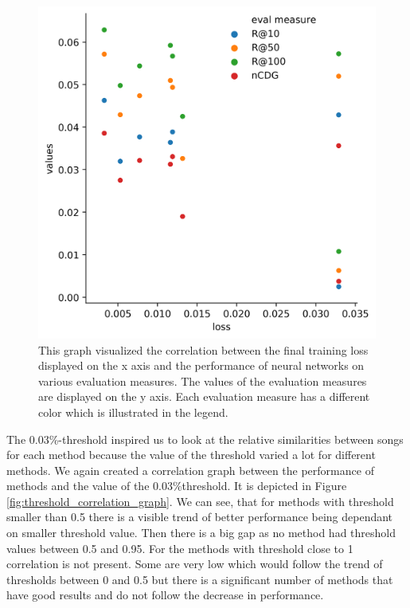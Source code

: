 \begin{figure}[h]
    \centering
	\includegraphics[width=1\linewidth]{./img/nn_training_performance_correlation.png}
	\caption[Training loss and performance correlation graph]{This graph visualized the correlation between the final training loss displayed on the x axis and the performance of neural networks on various evaluation measures. The values of the evaluation measures are displayed on the y axis. Each evaluation measure has a different color which is illustrated in the legend.}
	\label{fig:training_correlation_graph}
\end{figure}

The 0.03\%-threshold inspired us to look at the relative similarities between songs for each method because the value of the threshold varied a lot for different methods. We again created a correlation graph between the performance of methods and the value of the 0.03\%threshold. It is depicted in Figure \ref{fig:threshold_correlation_graph}. We can see, that for methods with threshold smaller than 0.5 there is a visible trend of better performance being dependant on smaller threshold value. Then there is a big gap as no method had threshold values between 0.5 and 0.95. For the methods with threshold close to 1 correlation is not present. Some are very low which would follow the trend of thresholds between 0 and 0.5 but there is a significant number of methods that have good results and do not follow the decrease in performance.

